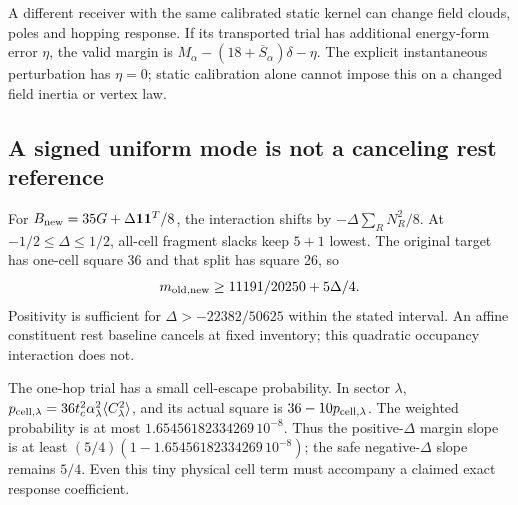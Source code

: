 A different receiver with the same calibrated static kernel can change
field clouds, poles and hopping response. If its transported trial has
additional energy-form error $\eta$, the valid margin is
$M_\alpha-(18+\overline S_\alpha)\delta-\eta$.
The explicit instantaneous perturbation has $\eta=0$; static calibration
alone cannot impose this on a changed field inertia or vertex law.

\subsection{A signed uniform mode is not a canceling rest reference}
\label{sec:uniform-mode-12}

For $B_{\rm new}=35G+\Delta\mathbf1\mathbf1^T/8$, the interaction shifts
by $-\Delta\sum_RN_R^2/8$. At $-1/2\le\Delta\le1/2$, all-cell fragment
slacks keep $5+1$ lowest. The original target has one-cell square 36 and
that split has square 26, so
\begin{equation}
 m_{{\rm old},{\rm new}}\ge11191/20250+5\Delta/4.
\end{equation}
Positivity is sufficient for $\Delta>-22382/50625$ within the stated
interval. An affine constituent rest baseline cancels at fixed inventory;
this quadratic occupancy interaction does not.

The one-hop trial has a small cell-escape probability. In sector $\lambda$,
$p_{{\rm cell},\lambda}=36t_c^2\alpha_\lambda^2\langle C_\lambda^2\rangle$,
and its actual square is $36-10p_{{\rm cell},\lambda}$.
The weighted probability is at most $1.65456182334269\,10^{-8}$.
Thus the positive-$\Delta$ margin slope is at least
$(5/4)(1-1.65456182334269\,10^{-8})$; the safe negative-$\Delta$ slope
remains $5/4$. Even this tiny physical cell term must accompany a claimed
exact response coefficient.
